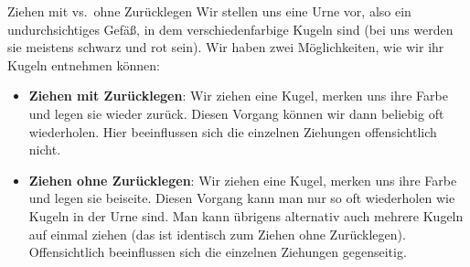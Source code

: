 \begin{bla}{Ziehen mit vs.\ ohne Zurücklegen}
  Wir stellen uns eine Urne vor, also ein undurchsichtiges Gefäß, in dem
  verschiedenfarbige Kugeln sind (bei uns werden sie meistens schwarz und rot sein).
  Wir haben zwei Möglichkeiten, wie wir ihr Kugeln entnehmen können:
  \begin{itemize}
    \item \textbf{Ziehen mit Zurücklegen}: Wir ziehen eine Kugel, merken uns ihre
    Farbe und legen sie wieder zurück. Diesen Vorgang können wir dann beliebig
    oft wiederholen. Hier beeinflussen sich die einzelnen Ziehungen offensichtlich nicht.

    \item \textbf{Ziehen ohne Zurücklegen}: Wir ziehen eine Kugel, merken uns ihre
    Farbe und legen sie beiseite. Diesen Vorgang kann man nur so oft wiederholen wie
    Kugeln in der Urne sind. Man kann übrigens alternativ auch mehrere Kugeln auf einmal
    ziehen (das ist identisch zum Ziehen ohne Zurücklegen). Offensichtlich beeinflussen sich die einzelnen Ziehungen gegenseitig.
  \end{itemize}
\end{bla}
